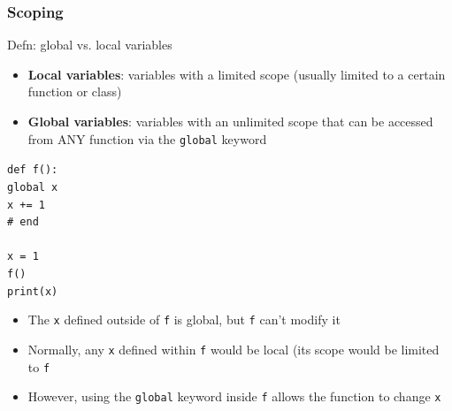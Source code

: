 \documentclass{beamer}
\newcommand{\code}[1]{\texttt{#1}}
\newcommand{\tab}{\hspace*{22pt}}
\begin{document}
\begin{frame}%
	\frametitle{Scoping}
	
	\begin{alertblock}{Defn: global vs. local variables}
		\begin{itemize}
			\item \textbf{Local variables}: variables with a limited scope (usually limited to a certain function or class)
			\item \textbf{Global variables}: variables with an unlimited scope that can be accessed from ANY function via the \code{global} keyword
		\end{itemize}
		
		\vspace{10pt}
			\code{def f():\\
			\tab global x \\
			\tab x += 1 \\
			\#  end \\
			\tab \\
			x = 1 \\
			f() \\
			print(x)
			}
		\endminipage\hfill
			\begin{itemize}
				\item The \code{x} defined outside of \code{f} is global, but \code{f} can't modify it
				\item Normally, any \code{x} defined within \code{f} would be local (its scope would be limited to \code{f}
				\item However, using the \code{global} keyword inside \code{f} allows the function to change \code{x}
			\end{itemize}
		\endminipage\hfill
	\end{alertblock}
	
\end{frame}
\end{document}
